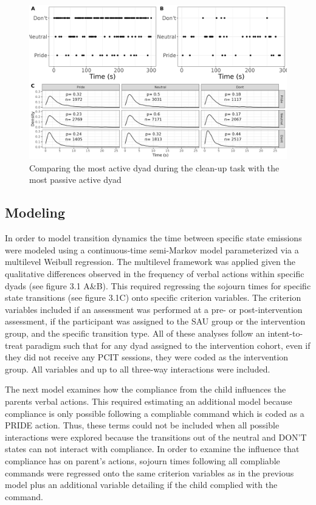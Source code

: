 \documentclass[12pt]{./styles/outhesis}
\begin{document}
\begin{figure}
\includegraphics[width=12cm]{figures/CLUPTimeSeries.png}
\caption{Comparing the most active dyad during the clean-up task with
the most passive active dyad}
\end{figure}

\subsection{Modeling}\label{modeling}

In order to model transition dynamics the time between specific state
emissions were modeled using a continuous-time semi-Markov model
parameterized via a multilevel Weibull regression. The multilevel
framework was applied given the qualitative differences observed in the
frequency of verbal actions within specific dyads (see figure 3.1 A\&B).
This required regressing the sojourn times for specific state
transitions (see figure 3.1C) onto specific criterion variables. The
criterion variables included if an assessment was performed at a pre- or
post-intervention assessment, if the participant was assigned to the SAU
group or the intervention group, and the specific transition type. All
of these analyses follow an intent-to-treat paradigm such that for any
dyad assigned to the intervention cohort, even if they did not receive
any PCIT sessions, they were coded as the intervention group. All
variables and up to all three-way interactions were included.

The next model examines how the compliance from the child influences the
parents verbal actions. This required estimating an additional model
because compliance is only possible following a compliable command which
is coded as a PRIDE action. Thus, these terms could not be included when
all possible interactions were explored because the transitions out of
the neutral and DON'T states can not interact with compliance. In order
to examine the influence that compliance has on parent's actions,
sojourn times following all compliable commands were regressed onto the
same criterion variables as in the previous model plus an additional
variable detailing if the child complied with the command.
\end{document}
